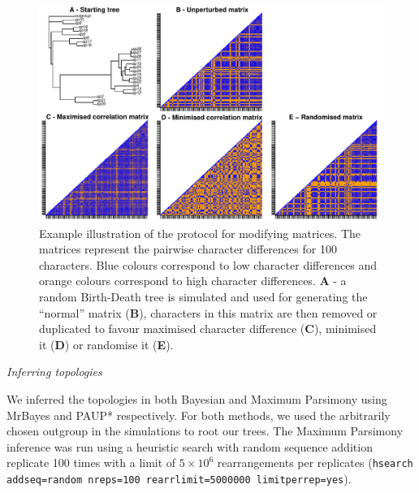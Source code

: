 \documentclass[12pt,letterpaper]{article}
\renewcommand{\subsection}[1]{%
\bigskip
\begin{center}
\begin{large}
\normalfont\itshape #1
\end{large}
\end{center}}
\begin{document}
\begin{figure}[!htbp]
\centering
   \includegraphics[width=1\textwidth]{Figures/Modif_matrix.pdf}
\caption{Example illustration of the protocol for modifying matrices. The matrices represent the pairwise character differences for 100 characters. Blue colours correspond to low character differences and orange colours correspond to high character differences. \textbf{A} - a random Birth-Death tree is simulated and used for generating the ``normal'' matrix (\textbf{B}), characters in this matrix are then removed or duplicated to favour maximised character difference (\textbf{C}), minimised it (\textbf{D}) or randomise it (\textbf{E}).}
\label{Fig:modif_matrix}
\end{figure}

\subsection{Inferring topologies}
We inferred the topologies in both Bayesian and Maximum Parsimony using MrBayes \citep[v3.2.6;][]{Ronquist2012mrbayes} and PAUP* \citep[v4.0a151;][]{swofford2001paup} respectively.
For both methods, we used the arbitrarily chosen outgroup in the simulations to root our trees.
The Maximum Parsimony inference was run using a heuristic search with random sequence addition replicate 100 times with a limit of $5\times10^6$ rearrangements per replicates (\texttt{hsearch addseq=random nreps=100 rearrlimit=5000000 limitperrep=yes}).
\end{document}
